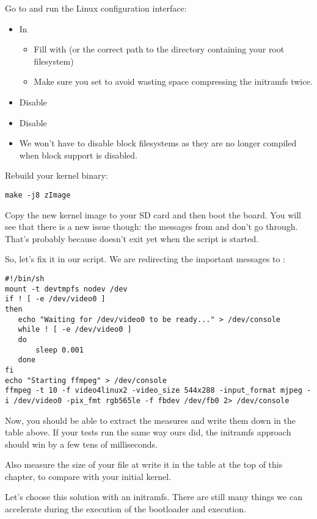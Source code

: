 Go to  and run the Linux
configuration interface:

\begin{itemize}
  \item In 
  \begin{itemize}
     \item Fill  with
 (or the correct path to the directory
containing your root filesystem)
     \item Make sure you set 
	   to avoid wasting space compressing the initramfs twice.
  \end{itemize}
  \item Disable 
  \item Disable 
  \item We won't have to disable block filesystems as they are no longer
compiled when block support is disabled.
\end{itemize}

Rebuild your kernel binary:
\begin{verbatim}
make -j8 zImage
\end{verbatim}

Copy the new kernel image to your SD card and then boot the board. You
will see that there is a new issue though: the messages from 
and  don't go through. That's probably because
 doesn't exit yet when the script is started.

So, let's fix it in our script. We are redirecting the important
messages to :

\begin{verbatim}
#!/bin/sh
mount -t devtmpfs nodev /dev
if ! [ -e /dev/video0 ]
then
   echo "Waiting for /dev/video0 to be ready..." > /dev/console
   while ! [ -e /dev/video0 ]
   do
       sleep 0.001
   done
fi
echo "Starting ffmpeg" > /dev/console
ffmpeg -t 10 -f video4linux2 -video_size 544x288 -input_format mjpeg -i /dev/video0 -pix_fmt rgb565le -f fbdev /dev/fb0 2> /dev/console
\end{verbatim}

Now, you should be able to extract the measures and write them down in
the table above. If your tests run the same way ours did, the
initramfs approach should win by a few tens of milliseconds.

Also measure the size of your  file at write it in the
table at the top of this chapter, to compare with your initial kernel.

Let's choose this solution with an initramfs. There are still many things we can
accelerate during the execution of the bootloader and execution.
